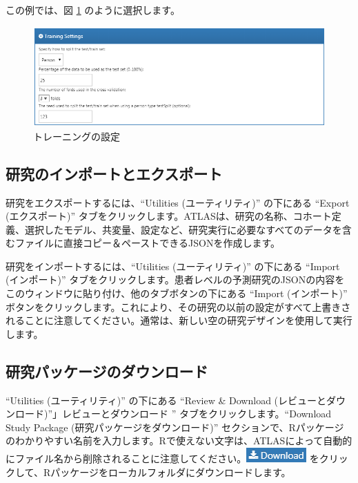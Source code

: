 \documentclass[
  11pt]{book}
\theoremstyle{definition}
\theoremstyle{definition}
\theoremstyle{definition}
\theoremstyle{definition}
\theoremstyle{remark}
\begin{document}
この例では、図 \ref{fig:trainingSettings} のように選択します。

\begin{figure}

{\centering \includegraphics[width=1\linewidth]{images/PatientLevelPrediction/trainingSettings} 

}

\caption{トレーニングの設定}\label{fig:trainingSettings}
\end{figure}

\subsection{研究のインポートとエクスポート}\label{ux7814ux7a76ux306eux30a4ux30f3ux30ddux30fcux30c8ux3068ux30a8ux30afux30b9ux30ddux30fcux30c8}

研究をエクスポートするには、``Utilities (ユーティリティ)'' の下にある ``Export (エクスポート)'' タブをクリックします。ATLASは、研究の名称、コホート定義、選択したモデル、共変量、設定など、研究実行に必要なすべてのデータを含むファイルに直接コピー＆ペーストできるJSONを作成します。

研究をインポートするには、``Utilities (ユーティリティ)'' の下にある ``Import (インポート)'' タブをクリックします。患者レベルの予測研究のJSONの内容をこのウィンドウに貼り付け、他のタブボタンの下にある ``Import (インポート)'' ボタンをクリックします。これにより、その研究の以前の設定がすべて上書きされることに注意してください。通常は、新しい空の研究デザインを使用して実行します。

\subsection{研究パッケージのダウンロード}\label{ux7814ux7a76ux30d1ux30c3ux30b1ux30fcux30b8ux306eux30c0ux30a6ux30f3ux30edux30fcux30c9}

``Utilities (ユーティリティ)'' の下にある ``Review \& Download (レビューとダウンロード)''」レビューとダウンロード '' タブをクリックします。``Download Study Package (研究パッケージをダウンロード)'' セクションで、Rパッケージのわかりやすい名前を入力します。Rで使えない文字は、ATLASによって自動的にファイル名から削除されることに注意してください。\includegraphics{images/PatientLevelPrediction/download.png} をクリックして、Rパッケージをローカルフォルダにダウンロードします。
\end{document}
